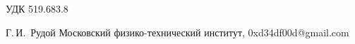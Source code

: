 \documentclass[11pt,a4paper]{article}
\begin{document}
УДК 519.683.8
\begin{center}

  \bigskip
  Г.\,И.~Рудой
  Московский физико-технический институт, 0xd34df00d@gmail.com
\end{center}

\begin{Введение}

\begin{comment}
Тут на днях писали про аналитическое нахождение производных, что напомнило мне об одной моей маленькой библиотечке на C++, которая делает почти то же, но во время компиляции.



В чём профит? Ответ прост: мне нужно было запрогать нахождение минимума достаточно сложной функции, считать производные этой функции по её параметрам ручкой на бумажке было лень, проверять потом, что я не опечатался при написании кода, и поддерживать этот самый код — лень вдвойне, поэтому было решено написать штуковину, которая это сделает за меня. Ну, чтобы в коде можно было написать что-то такое:

using Formula_t = decltype (k * (_1 - r0) / (_1 + r0) * (g0 / (alpha0 - logr0 / Num<300>) - _1));    // сама формула
const auto residual = Formula_t::Eval (datapoint) - knownValue;    // регрессионный остаток

// производные по параметрам:
const auto dg0 = VarDerivative_t<Formula_t, decltype (g0)>::Eval (datapoint);
const auto dalpha0 = VarDerivative_t<Formula_t, decltype (alpha0)>::Eval (datapoint);
const auto dk = VarDerivative_t<Formula_t, decltype (k)>::Eval (datapoint);

Вместо крокодилов, которые получатся, если брать частные производные функции на картинке вначале (вернее, некоторого её упрощённого варианта, но он выглядит не так страшно).

Ещё неплохо быть достаточно уверенным, что компилятор это соптимизирует так, как если бы соответствующие производные и функции были написаны руками. А уверенным быть бы хотелось — находить минимум нужно было очень много раз (действительно много, где-то от сотни миллионов до миллиарда, в этом была суть некоего вычислительного эксперимента), поэтому вычисление производных было бы бутылочным горлышком, происходи оно во время выполнения через какую-нибудь рекурсию по древообразной структуре. Если же заставить компилятор вычислять производную, собственно, во время компиляции, то есть шанс, что он по получившемуся коду ещё пройдётся оптимизатором, и мы не потеряем по сравнению с ручным выписыванием всех производных. Шанс реализовался, кстати.


\end{comment}
\end{Введение}
\end{document}
